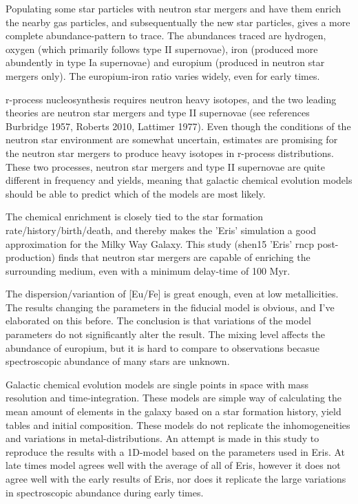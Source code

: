 Populating some star particles with neutron star mergers and have them enrich the nearby gas particles, and subsequentually the new star particles, gives a more complete abundance-pattern to trace.
The abundances traced are hydrogen, oxygen (which primarily follows type II supernovae), iron (produced more abundently in type Ia supernovae) and europium (produced in neutron star mergers only). The europium-iron ratio varies widely, even for early times.

r-process nucleosynthesis requires neutron heavy isotopes, and the two leading theories are neutron star mergers and type II supernovae (see references Burbridge 1957, Roberts 2010, Lattimer 1977). Even though the conditions of the neutron star environment are somewhat uncertain, estimates are promising for the neutron star mergers to produce heavy isotopes in r-process distributions.
These two processes, neutron star mergers and type II supernovae are quite different in frequency and yields, meaning that galactic chemical evolution models should be able to predict which of the models are most likely.

The chemical enrichment is closely tied to the star formation rate/history/birth/death, and thereby makes the 'Eris' simulation a good approximation for the Milky Way Galaxy.
This study (shen15 'Eris' rncp post-production) finds that neutron star mergers are capable of enriching the surrounding medium, even with a minimum delay-time of 100 Myr.

The dispersion/variantion of [Eu/Fe] is great enough, even at low metallicities.
The results changing the parameters in the fiducial model is obvious, and I've elaborated on this before.
The conclusion is that variations of the model parameters do not significantly alter the result.
The mixing level affects the abundance of europium, but it is hard to compare to observations becasue spectroscopic abundance of many stars are unknown.

Galactic chemical evolution models are single points in space with mass resolution and time-integration. These models are simple way of calculating the mean amount of elements in the galaxy based on a star formation history, yield tables and initial composition.
These models do not replicate the inhomogeneities and variations in metal-distributions.
An attempt is made in this study to reproduce the results with a 1D-model based on the parameters used in Eris.
At late times model agrees well with the average of all of Eris, however it does not agree well with the early results of Eris, nor does it replicate the large variations in spectroscopic abundance during early times.

\fi
